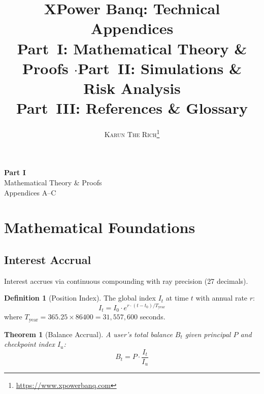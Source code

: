 \documentclass[10pt,a4paper,twocolumn]{article}
\title{\textbf{\Large XPower Banq: Technical Appendices}\\[0.3em]
\normalsize Part~I\@: Mathematical Theory \& Proofs \enspace$\cdot$\enspace Part~II\@: Simulations \& Risk Analysis\\
Part~III\@: References \& Glossary}
\author{
    \textsc{Karun The Rich}\thanks{\url{https://www.xpowerbanq.com}}
}
\date{}
\theoremstyle{definition}
\newtheorem{definition}{Definition}[section]
\theoremstyle{plain}
\newtheorem{theorem}{Theorem}[section]
\theoremstyle{remark}
\begin{document}
\maketitle


\appendix



\clearpage
\onecolumn
\thispagestyle{empty}
\vspace*{\fill}
\begin{center}
  {\fontsize{36}{42}\selectfont\bfseries Part I}\\[1.5em]
  {\LARGE Mathematical Theory \& Proofs}\\[1em]
  {\large\color{codegray} Appendices A--C}
\end{center}
\vspace*{\fill}
\clearpage
\twocolumn

\section{Mathematical Foundations}
\label{apx:math}

\subsection{Interest Accrual}

Interest accrues via continuous compounding with ray precision (27 decimals).

\begin{definition}[Position Index]
The global index $I_t$ at time $t$ with annual rate $r$:
\begin{equation}
I_t = I_0 \cdot e^{r \cdot (t - t_0) / T_{\text{year}}}
\end{equation}
where $T_{\text{year}} = 365.25 \times 86400 = 31{,}557{,}600$ seconds.
\end{definition}

\begin{theorem}[Balance Accrual]
A user's total balance $B_t$ given principal $P$ and checkpoint index $I_u$:
\begin{equation}
B_t = P \cdot \frac{I_t}{I_u}
\end{equation}
\end{theorem}
\end{document}
